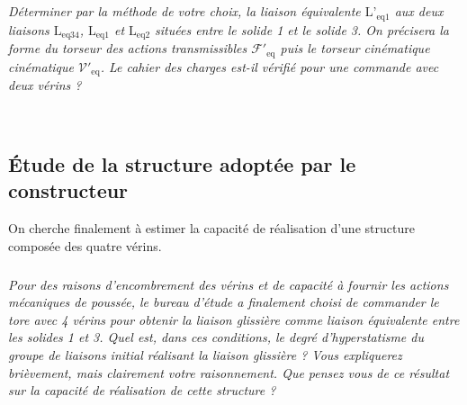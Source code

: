 \documentclass[10pt,fleqn]{article} %
\begin{document}
\begin{multicols}{2}
\subparagraph{}\textit{Déterminer par la méthode de votre choix, la liaison équivalente $\text{L'}_{\text{eq}1}$ aux deux liaisons $\text{L}_{\text{eq}34}$, $\text{L}_{\text{eq}1}$ et $\text{L}_{\text{eq}2}$ situées
entre le solide 1 et le solide 3. On précisera la forme du torseur des actions transmissibles $\mathcal{F}'_{\text{eq}}$ puis le torseur cinématique cinématique $\mathcal{V}'_{\text{eq}}$. Le cahier des charges est-il vérifié pour une commande avec deux vérins ?}
\ifprof
\begin{corrige}~\\
\end{corrige}
\else
\fi

\subsection*{Étude de la structure adoptée par le constructeur}
\begin{obj}
On cherche finalement à estimer la capacité de réalisation d'une structure composée des quatre
vérins.
\end{obj}





\subparagraph{}\textit{Pour des raisons d'encombrement des vérins et de capacité à fournir les actions mécaniques de poussée, le
bureau d'étude a finalement choisi de commander le tore avec 4 vérins pour obtenir la liaison glissière
comme liaison équivalente entre les solides 1 et 3. Quel est, dans ces conditions, le degré d'hyperstatisme du
groupe de liaisons initial réalisant la liaison glissière ? Vous expliquerez brièvement, mais clairement votre
raisonnement. Que pensez vous de ce résultat sur la capacité de réalisation de cette structure ?}
\ifprof
\begin{corrige}~\\
\end{corrige}
\else
\fi

\ifprof
\else
\end{multicols}
\fi

\end{document}
